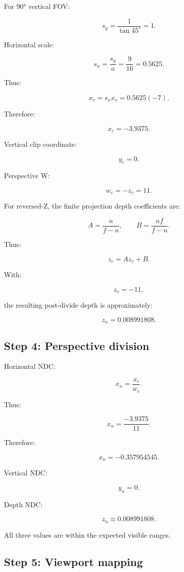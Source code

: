 For 90° vertical FOV:

\[ s_y=\frac1{\tan45^\circ}=1. \]

Horizontal scale:

\[ s_x=\frac{s_y}{a}=\frac9{16}=0.5625. \]

Thus:

\[ x_c=s_xx_v=0.5625(-7). \]

Therefore:

\[ \boxed{x_c=-3.9375}. \]

Vertical clip coordinate:

\[ \boxed{y_c=0}. \]

Perspective W:

\[ \boxed{w_c=-z_v=11}. \]

For reversed-Z, the finite projection depth coefficients are:

\[ A=\frac n{f-n}, \qquad B=\frac{nf}{f-n}. \]

Thus:

\[ z_c=Az_v+B. \]

With:

\[ z_v=-11, \]

the resulting post-divide depth is approximately:

\[ \boxed{z_n=0.008991808}. \]

\subsection{Step 4: Perspective division}\label{02-foundations-ii-ch037-step-4-perspective-division}

\hypertarget{02-foundations-ii-ch037-step-4-perspective-division}{}

Horizontal NDC:

\[ x_n=\frac{x_c}{w_c}. \]

Thus:

\[ x_n=\frac{-3.9375}{11}. \]

Therefore:

\[ \boxed{ x_n=-0.357954545. } \]

Vertical NDC:

\[ \boxed{y_n=0}. \]

Depth NDC:

\[ \boxed{z_n\approx0.008991808}. \]

All three values are within the expected visible ranges.

\subsection{Step 5: Viewport mapping}\label{02-foundations-ii-ch037-step-5-viewport-mapping}

